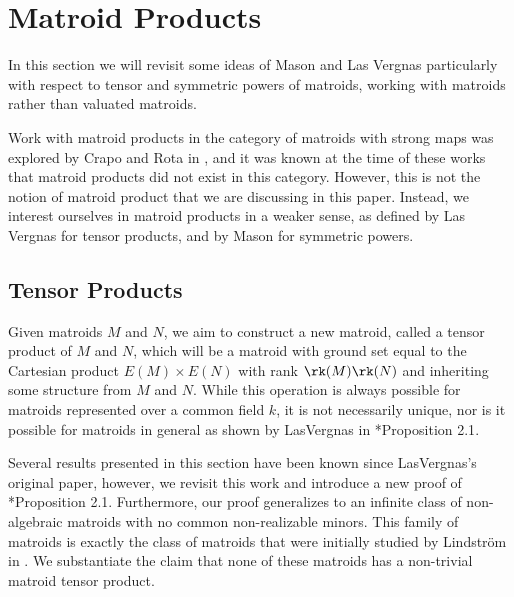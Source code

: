\section{Matroid Products}\label{sec:MatProds}

In this section we will revisit some ideas of Mason \cite{MGlueing} and Las Vergnas \cite{LV81} particularly with respect to tensor and symmetric powers of matroids, working with matroids rather than valuated matroids.
   
Work with matroid products in the category of matroids with strong maps was explored by Crapo and Rota in \cite{CR70}, and it was known at the time of these works that matroid products did not exist in this category. However, this is not the notion of matroid product that we are discussing in this paper. Instead, we interest ourselves in matroid products in a weaker sense, as defined by Las Vergnas for tensor products, and by Mason for symmetric powers.
\subsection{Tensor Products}\label{subsec:tensorProducts}
    Given matroids $M$ and $N$, we aim to construct a new matroid, called a tensor product of $M$ and $N$, which will be a matroid with ground set equal to the Cartesian product $E(M)\times E(N)$ with rank $\rk(M)\rk(N)$ and inheriting some structure from $M$ and $N$. While this operation is always possible for matroids represented over a common field $k$, it is not necessarily unique, nor is it  possible for matroids in general as shown by LasVergnas in \cite{LV81}*{Proposition 2.1}. 
    
    Several results presented in this section have been known since LasVergnas's original paper, however, we revisit this work and introduce a new proof of \cite{LV81}*{Proposition 2.1}. Furthermore, our proof generalizes to an infinite class of non-algebraic matroids with no common non-realizable minors. This family of matroids is exactly the class of matroids that were initially studied by Lindstr\"om in \cite{Lind88}. We substantiate the claim that none of these matroids has a non-trivial matroid tensor product.
    
